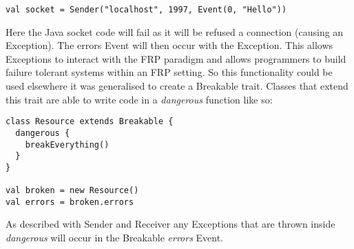 \begin{verbatim}
val socket = Sender("localhost", 1997, Event(0, "Hello")) 
\end{verbatim}

  Here the Java socket code will fail as it will be refused a connection (causing an Exception). The errors Event
  will then occur with the Exception. This allows Exceptions to interact with the FRP paradigm and allows programmers to 
  build failure tolerant systems within an FRP setting. So this functionality could be used elsewhere it was generalised
  to create a Breakable trait. Classes that extend this trait are able to write code in a \emph{dangerous} function like so:

\begin{verbatim}
class Resource extends Breakable {
  dangerous {
    breakEverything()
  }
}

val broken = new Resource()
val errors = broken.errors
\end{verbatim}
  
  As described with Sender and Receiver any Exceptions that are thrown inside \emph{dangerous} will occur in the Breakable  
  \emph{errors} Event. 
